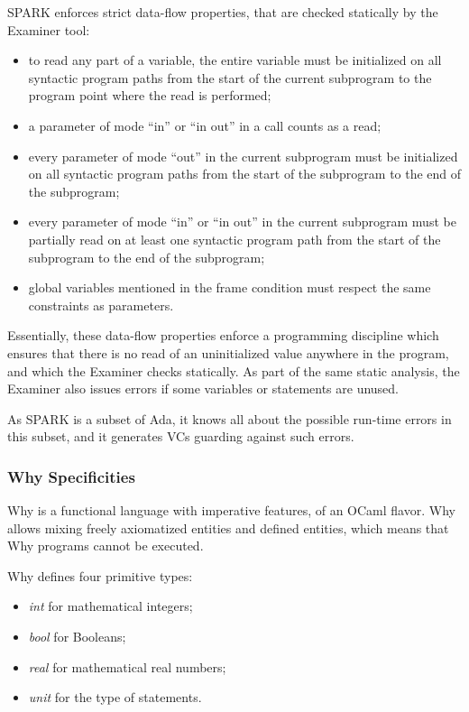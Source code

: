 \documentclass{article}
\begin{document}
SPARK enforces strict data-flow properties, that are checked statically by the
Examiner tool:
\begin{itemize}
\item to read any part of a variable, the entire variable must be initialized
  on all syntactic program paths from the start of the current subprogram to
  the program point where the read is performed;
\item a parameter of mode ``in'' or ``in out'' in a call counts as a read;
\item every parameter of mode ``out'' in the current subprogram must be
  initialized on all syntactic program paths from the start of the subprogram
  to the end of the subprogram;
\item every parameter of mode ``in'' or ``in out'' in the current subprogram
  must be partially read on at least one syntactic program path from the start
  of the subprogram to the end of the subprogram;
\item global variables mentioned in the frame condition must respect the same
  constraints as parameters.
\end{itemize}

Essentially, these data-flow properties enforce a programming discipline which
ensures that there is no read of an uninitialized value anywhere in the
program, and which the Examiner checks statically.  As part of the same static
analysis, the Examiner also issues errors if some variables or statements are
unused.

As SPARK is a subset of Ada, it knows all about the possible run-time errors in
this subset, and it generates VCs guarding against such errors.

\subsubsection{Why Specificities}

Why is a functional language with imperative features, of an OCaml flavor. Why
allows mixing freely axiomatized entities and defined entities, which means
that Why programs cannot be executed.

Why defines four primitive types:
\begin{itemize}
\item \emph{int} for mathematical integers;
\item \emph{bool} for Booleans;
\item \emph{real} for mathematical real numbers;
\item \emph{unit} for the type of statements.
\end{itemize}
\end{document}
